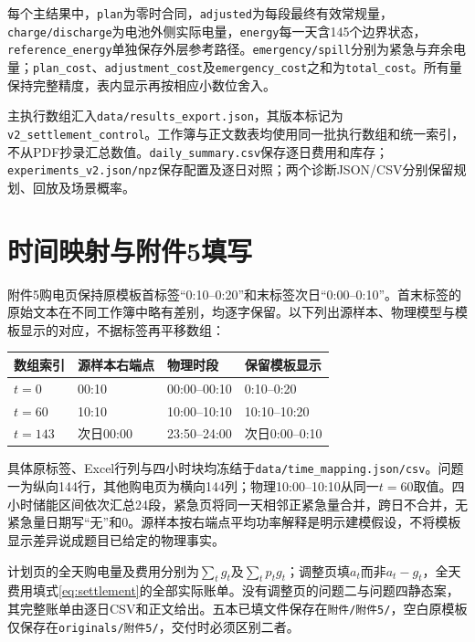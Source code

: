 每个主结果中，\texttt{plan}为零时合同，\texttt{adjusted}为每段最终有效常规量，\texttt{charge/discharge}为电池外侧实际电量，\texttt{energy}每一天含145个边界状态，\texttt{reference\_energy}单独保存外层参考路径。\texttt{emergency/spill}分别为紧急与弃余电量；\texttt{plan\_cost}、\texttt{adjustment\_cost}及\texttt{emergency\_cost}之和为\texttt{total\_cost}。所有量保持完整精度，表内显示再按相应小数位舍入。

主执行数组汇入\texttt{data/results\_export.json}，其版本标记为\texttt{v2\_settlement\_control}。工作簿与正文数表均使用同一批执行数组和统一索引，不从PDF抄录汇总数值。\texttt{daily\_summary.csv}保存逐日费用和库存；\texttt{experiments\_v2.json/npz}保存配置及逐日对照；两个诊断JSON/CSV分别保留规划、回放及场景概率。

\section{时间映射与附件5填写}

附件5购电页保持原模板首标签“0:10--0:20”和末标签次日“0:00--0:10”。首末标签的原始文本在不同工作簿中略有差别，均逐字保留。以下列出源样本、物理模型与模板显示的对应，不据标签再平移数组：

\begin{center}\small
\begin{tabular}{llll}\toprule
数组索引 & 源样本右端点 & 物理时段 & 保留模板显示\\\midrule
$t=0$ & 00:10 & 00:00--00:10 & 0:10--0:20\\
$t=60$ & 10:10 & 10:00--10:10 & 10:10--10:20\\
$t=143$ & 次日00:00 & 23:50--24:00 & 次日0:00--0:10\\
\bottomrule\end{tabular}
\end{center}

具体原标签、Excel行列与四小时块均冻结于\texttt{data/time\_mapping.json/csv}。问题一为纵向144行，其他购电页为横向144列；物理10:00--10:10从同一$t=60$取值。四小时储能区间依次汇总24段，紧急页将同一天相邻正紧急量合并，跨日不合并，无紧急量日期写“无”和0。源样本按右端点平均功率解释是明示建模假设，不将模板显示差异说成题目已给定的物理事实。

计划页的全天购电量及费用分别为$\sum_tg_t$及$\sum_tp_tg_t$；调整页填$a_t$而非$a_t-g_t$，全天费用填式\eqref{eq:settlement}的全部实际账单。没有调整页的问题二与问题四静态案，其完整账单由逐日CSV和正文给出。五本已填文件保存在\texttt{附件/附件5/}，空白原模板仅保存在\texttt{originals/附件5/}，交付时必须区别二者。

